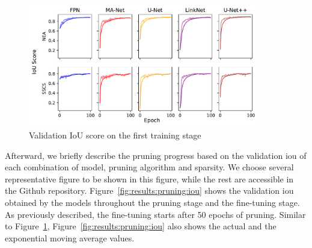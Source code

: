 \documentclass[mathematics,article,submit,pdftex,moreauthors]{Definitions/mdpi}
\begin{document}
\begin{figure}[htbp]
    \begin{center}
    \includegraphics[width=0.9\textwidth]{figures/iou_training_progress.pdf}
    \caption{Validation IoU score on the first training stage}
    \label{fig:results:training:iou}
    \end{center}
\end{figure}

Afterward, we briefly describe the pruning
progress based on the validation \ac{iou} of
each combination of model, pruning algorithm
and sparsity. We choose several representative
figure to be shown in this figure, while 
the rest are accessible in the Github repository.
Figure~\ref{fig:results:pruning:iou} shows the validation
\ac{iou} obtained by the models throughout the pruning
stage and the fine-tuning stage. As previously described,
the fine-tuning starts after 50 epochs of pruning. 
Similar to Figure~\ref{fig:results:training:iou},
Figure~\ref{fig:results:pruning:iou} also shows
the actual and the exponential moving average values.
\end{document}

